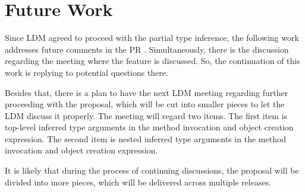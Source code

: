 \chapter{Future Work} \label{sect14:future}

Since LDM agreed to proceed with the partial type inference, the following work addresses future comments in the PR \cite{online:pull2}. 
Simultaneously, there is the discussion \cite{online:mettingSummaryDisc} regarding the meeting where the feature is discussed. 
So, the continuation of this work is replying to potential questions there.
\par
Besides that, there is a plan to have the next LDM meeting regarding further proceeding with the proposal, which will be cut into smaller pieces to let the LDM discuss it properly. 
The meeting will regard two items.
The first item is top-level inferred type arguments in the method invocation and object creation expression. 
The second item is nested inferred type arguments in the method invocation and object creation expression.
\par
It is likely that during the process of continuing discussions, the proposal will be divided into more pieces, which will be delivered across multiple releases.